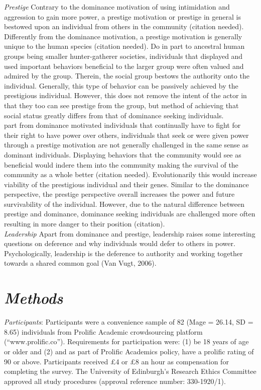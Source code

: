 \documentclass[
  english,
  a4paper]{apa7}
\begin{document}
\emph{Prestige}
Contrary to the dominance motivation of using intimidation and aggression to gain more power, a prestige motivation or prestige in general is bestowed upon an individual from others in the community (citation needed). Differently from the dominance motivation, a prestige motivation is generally unique to the human species (citation needed). Do in part to ancestral human groups being smaller hunter-gatherer societies, individuals that displayed and used important behaviors beneficial to the larger group were often valued and admired by the group. Therein, the social group bestows the authority onto the individual. Generally, this type of behavior can be passively achieved by the prestigious individual. However, this does not remove the intent of the actor in that they too can see prestige from the group, but method of achieving that social status greatly differs from that of dominance seeking individuals.\\
part from dominance motivated individuals that continually have to fight for their right to have power over others, individuals that seek or were given power through a prestige motivation are not generally challenged in the same sense as dominant individuals. Displaying behaviors that the community would see as beneficial would indere them into the community making the survival of the community as a whole better (citation needed). Evolutionarily this would increase viability of the prestigious individual and their genes. Similar to the dominance perspective, the prestige perspective overall increases the power and future survivability of the individual. However, due to the natural difference between prestige and dominance, dominance seeking individuals are challenged more often resulting in more danger to their position (citation).\\

\emph{Leadership}
Apart from dominance and prestige, leadership raises some interesting questions on deference and why individuals would defer to others in power. Psychologically, leadership is the deference to authority and working together towards a shared common goal (Van Vugt, 2006).

\hypertarget{methods}{%
\section{\texorpdfstring{\emph{Methods}}{Methods}}\label{methods}}

\emph{Participants}: Participants were a convenience sample of 82 (Mage = 26.14, SD = 8.65) individuals from Prolific Academic crowdsourcing platform (``www.prolific.co''). Requirements for participation were: (1) be 18 years of age or older and (2) and as part of Prolific Academics policy, have a prolific rating of 90 or above. Participants received £4 or £8 an hour as compensation for completing the survey. The University of Edinburgh's Research Ethics Committee approved all study procedures (approval reference number: 330-1920/1).
\end{document}
